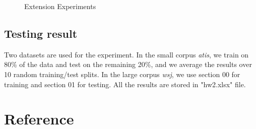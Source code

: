 \documentclass[winfonts,UTF8]{article}
\begin{document}
\begin{enumerate}
\begin{figure}[h]
\caption{Extension Experiments}
\label{fig:res}
\end{figure}



\subsection{Testing result}
Two datasets are used for the experiment. In the small corpus \emph{atis}, we train on 80\% of the data and test on the remaining 20\%, and we average the results over 10 random training/test splits. In the large corpus \emph{wsj}, we use section 00 for training and section 01 for testing. All the results are stored in "hw2.xlsx" file.



\end{enumerate}



\section{Reference}
\renewcommand\refname{\vskip -0.25cm}
\refname


\end{document}
